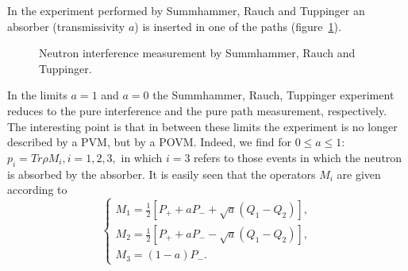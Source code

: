 \documentclass{ws-procs975x65}
\begin{document}
{In the experiment performed by Summhammer, Rauch and
Tuppinger\cite{SuRaTu} an absorber (transmissivity $a$) is
inserted in one of the paths (figure~\ref{fig3}).
\begin{figure}
 \caption{Neutron interference measurement by
Summhammer, Rauch and Tuppinger.}
 \label{fig3}
\end{figure}
In the limits $a=1$ and $a=0$ the Summhammer, Rauch, Tuppinger
experiment reduces to the pure interference and the pure path
measurement, respectively. The interesting point is that in
between these limits the experiment is no longer described by a
PVM, but by a POVM. Indeed, we find for $0\leq a\leq 1$: $p_i = Tr
\rho M_i, i=1,2,3,$ in which $i=3$ refers to those events in which
the neutron is absorbed by the absorber. It is easily
seen\cite{MuMa90} that the operators $M_i$ are given according to
\begin{equation}\label{5}\left\{\begin{array}{l}
 M_1=\frac{1}{2}[P_++aP_- + \sqrt{a}(Q_1-Q_2)],\\
 M_2=\frac{1}{2}[P_++aP_- -\sqrt{a}(Q_1-Q_2)],\\
 M_{3}=(1-a)P_-.
 \end{array}\right. \end{equation}

}
\end{document}
